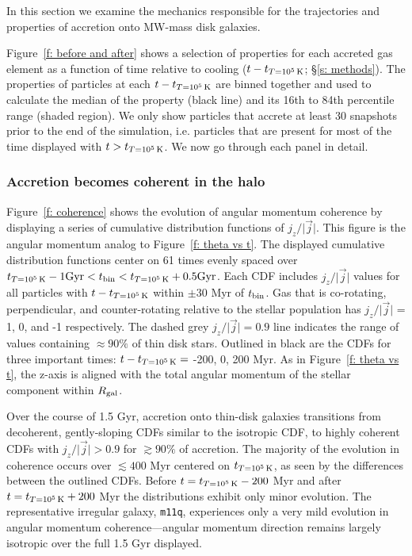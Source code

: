 \documentclass[fleqn,usenatbib]{mnras}
\newcommand{\tcon}{t_{T=10^5\,{\rm K}}}
\begin{document}
In this section we examine the mechanics responsible for the trajectories and properties of accretion onto MW-mass disk galaxies.

Figure~\ref{f: before and after} shows a selection of properties for each accreted gas element as a function of time relative to cooling  ($t - \tcon$; \S\ref{s: methods}).
The properties of particles at each $t - \tcon$ are binned together and used to calculate the median of the property (black line) and its 16th to 84th percentile range (shaded region).
We only show particles that accrete at least 30 snapshots prior to the end of the simulation, i.e. particles that are present for most of the time displayed with $t > \tcon$.
We now go through each panel in detail.

\subsubsection{Accretion becomes coherent in the halo}
\label{s: mechanics -- coherence}

Figure~\ref{f: coherence} shows the evolution of angular momentum coherence by displaying a series of cumulative distribution functions of $j_z / \vert \vec j \vert$.
This figure is the angular momentum analog to Figure~\ref{f: theta vs t}.
The displayed cumulative distribution functions center on 61 times evenly spaced over $\tcon - 1 {\rm Gyr} < t_{\rm bin} < \tcon + 0.5 {\rm Gyr}$.
Each CDF includes $j_z / \vert \vec j \vert$ values for all particles with $t - \tcon$ within $\pm$30 Myr of $t_{\rm bin}$.
Gas that is co-rotating, perpendicular, and counter-rotating relative to the stellar population has $j_z / \vert \vec j \vert$ = 1, 0, and -1 respectively.
The dashed grey $j_z / \vert \vec j \vert = 0.9$ line indicates the range of values containing $\approx 90\%$ of thin disk stars.
Outlined in black are the CDFs for three important times: $t - \tcon =$ -200, 0, 200 Myr.
As in Figure~\ref{f: theta vs t}, the z-axis is aligned with the total angular momentum of the stellar component within $R_{\rm gal}$.

Over the course of 1.5 Gyr, accretion onto thin-disk galaxies transitions from decoherent, gently-sloping CDFs similar to the isotropic CDF, to highly coherent CDFs with $j_z/\vert \vec j \vert > 0.9$ for $\gtrsim 90\%$ of accretion.
The majority of the evolution in coherence occurs over $\lesssim 400$ Myr centered on $\tcon$, as seen by the differences between the outlined CDFs.
Before $t = \tcon - 200$ Myr and after $t = \tcon + 200$ Myr the distributions exhibit only minor evolution.
The representative irregular galaxy, \texttt{m11q}, experiences only a very mild evolution in angular momentum coherence---angular momentum direction remains largely isotropic over the full 1.5 Gyr displayed.
\end{document}
